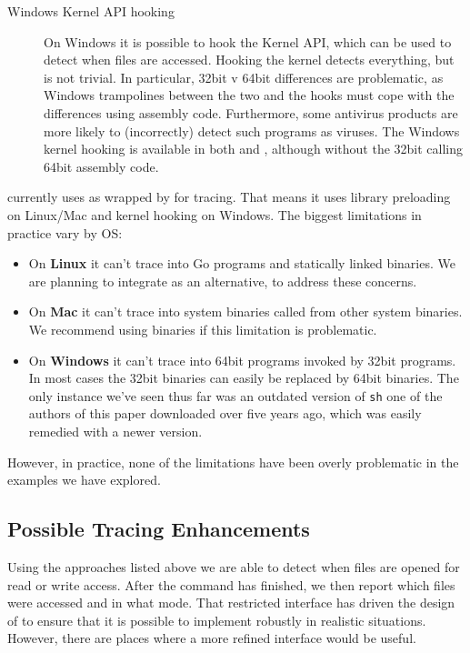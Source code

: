 \begin{description}
\item[Windows Kernel API hooking] On Windows it is possible to hook the Kernel API, which can be used to detect when files are accessed. Hooking the kernel detects everything, but is not trivial. In particular, 32bit v 64bit differences are problematic, as Windows trampolines between the two and the hooks must cope with the differences using assembly code. Furthermore, some antivirus products are more likely to (incorrectly) detect such programs as viruses. The Windows kernel hooking is available in both \Fsatrace and \Bigbro, although without the 32bit calling 64bit assembly code.
\end{description}

\Rattle currently uses \Fsatrace as wrapped by \Shake for tracing. That means it uses library preloading on Linux/Mac and kernel hooking on Windows. The biggest limitations in practice vary by OS:

\begin{itemize}
\item On \textbf{Linux} it can't trace into Go programs and statically linked binaries. We are planning to integrate \Bigbro as an alternative, to address these concerns.
\item On \textbf{Mac} it can't trace into system binaries called from other system binaries. We recommend using \Nix binaries if this limitation is problematic.
\item On \textbf{Windows} it can't trace into 64bit programs invoked by 32bit programs. In most cases the 32bit binaries can easily be replaced by 64bit binaries. The only instance we've seen thus far was an outdated version of \texttt{sh} one of the authors of this paper downloaded over five years ago, which was easily remedied with a newer version.
\end{itemize}

However, in practice, none of the limitations have been overly problematic in the examples we have explored.

\subsection{Possible Tracing Enhancements}

Using the approaches listed above we are able to detect when files are opened for read or write access. After the command has finished, we then report which files were accessed and in what mode. That restricted interface has driven the design of \Rattle to ensure that it is possible to implement \Rattle robustly in realistic situations. However, there are places where a more refined interface would be useful.

